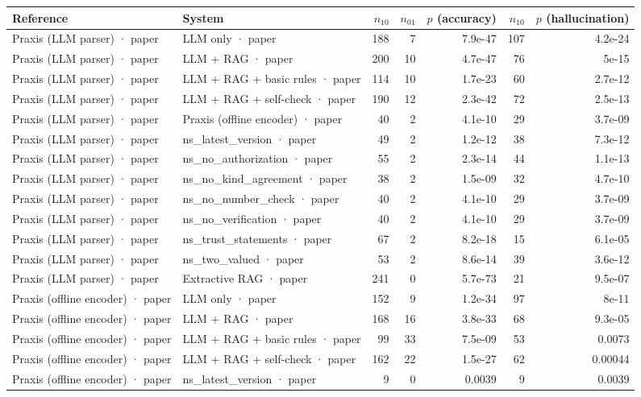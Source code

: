 \begin{tabular}{llrrrrr}
\toprule
Reference & System & $n_{10}$ & $n_{01}$ & $p$ (accuracy) & $n_{10}$ & $p$ (hallucination) \\
\midrule
Praxis (LLM parser) · paper & LLM only · paper & 188 & 7 & 7.9e-47 & 107 & 4.2e-24 \\
Praxis (LLM parser) · paper & LLM + RAG · paper & 200 & 10 & 4.7e-47 & 76 & 5e-15 \\
Praxis (LLM parser) · paper & LLM + RAG + basic rules · paper & 114 & 10 & 1.7e-23 & 60 & 2.7e-12 \\
Praxis (LLM parser) · paper & LLM + RAG + self-check · paper & 190 & 12 & 2.3e-42 & 72 & 2.5e-13 \\
Praxis (LLM parser) · paper & Praxis (offline encoder) · paper & 40 & 2 & 4.1e-10 & 29 & 3.7e-09 \\
Praxis (LLM parser) · paper & ns_latest_version · paper & 49 & 2 & 1.2e-12 & 38 & 7.3e-12 \\
Praxis (LLM parser) · paper & ns_no_authorization · paper & 55 & 2 & 2.3e-14 & 44 & 1.1e-13 \\
Praxis (LLM parser) · paper & ns_no_kind_agreement · paper & 38 & 2 & 1.5e-09 & 32 & 4.7e-10 \\
Praxis (LLM parser) · paper & ns_no_number_check · paper & 40 & 2 & 4.1e-10 & 29 & 3.7e-09 \\
Praxis (LLM parser) · paper & ns_no_verification · paper & 40 & 2 & 4.1e-10 & 29 & 3.7e-09 \\
Praxis (LLM parser) · paper & ns_trust_statements · paper & 67 & 2 & 8.2e-18 & 15 & 6.1e-05 \\
Praxis (LLM parser) · paper & ns_two_valued · paper & 53 & 2 & 8.6e-14 & 39 & 3.6e-12 \\
Praxis (LLM parser) · paper & Extractive RAG · paper & 241 & 0 & 5.7e-73 & 21 & 9.5e-07 \\
Praxis (offline encoder) · paper & LLM only · paper & 152 & 9 & 1.2e-34 & 97 & 8e-11 \\
Praxis (offline encoder) · paper & LLM + RAG · paper & 168 & 16 & 3.8e-33 & 68 & 9.3e-05 \\
Praxis (offline encoder) · paper & LLM + RAG + basic rules · paper & 99 & 33 & 7.5e-09 & 53 & 0.0073 \\
Praxis (offline encoder) · paper & LLM + RAG + self-check · paper & 162 & 22 & 1.5e-27 & 62 & 0.00044 \\
Praxis (offline encoder) · paper & ns_latest_version · paper & 9 & 0 & 0.0039 & 9 & 0.0039 \\

\end{tabular}
